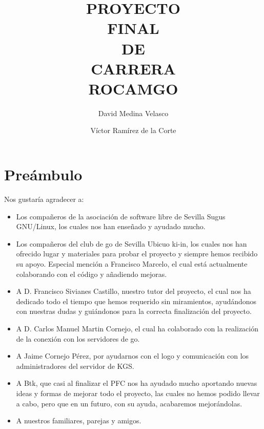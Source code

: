 \documentclass[12pt,a4papert,woside,openright,titlepage,final]{book}
\begin{document}

\title{PROYECTO\\ FINAL\\ DE \\CARRERA \\ ROCAMGO\\}
\author{David Medina Velasco \and Víctor Ramírez de la Corte}
\maketitle

\marginsize{3cm}{2cm}{2cm}{2cm} %
\tableofcontents  %

 
\chapter*{Preámbulo} 

Nos gustaría agradecer a: 
\begin{itemize} 
    \item Los compañeros de la asociación de software libre de Sevilla Sugus 
    GNU/Linux, los cuales nos han enseñado y ayudado mucho.  
    \item Los compañeros del club de go de Sevilla Ubicuo ki-in, los cuales nos
    han ofrecido lugar y materiales para probar el proyecto y siempre hemos 
    recibido su apoyo. Especial mención a Francisco Marcelo, el cual está
    actualmente colaborando con el código y añadiendo mejoras. 
    \item A D. Francisco Sivianes Castillo, nuestro tutor del proyecto, el cual 
    nos ha dedicado todo el tiempo que hemos requerido sin miramientos, 
    ayudándonos con nuestras dudas y guiándonos para la correcta finalización 
    del proyecto.  
    \item A D. Carlos Manuel Martin Cornejo, el cual ha colaborado con la 
    realización de la conexión con los servidores de go.  
    \item A Jaime Cornejo Pérez, por ayudarnos con el logo y comunicación con 
    los administradores del servidor de KGS.  
    \item A Btk, que casi al finalizar el PFC nos ha ayudado mucho aportando
    nuevas ideas y formas de mejorar todo el proyecto, las cuales no hemos
    podido llevar a cabo, pero que en un futuro, con su ayuda, acabaremos
    mejorándolas.
    \item A nuestros familiares, parejas y amigos.
\end{itemize}
\end{document}
